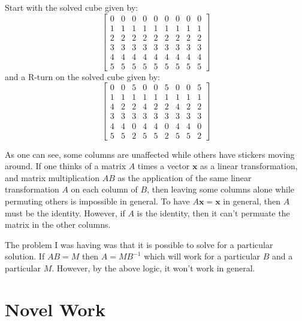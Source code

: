 \documentclass[11pt, oneside]{article}
\newcommand{\ve}[1]{\mathbf{#1}}
\theoremstyle{plain}
\begin{document}
Start with the solved cube given by:
\[ \begin{bmatrix}
0 & 0 & 0 & 0 & 0 & 0 & 0 & 0 & 0 \\
1 & 1 & 1 & 1 & 1 & 1 & 1 & 1 & 1 \\
2 & 2 & 2 & 2 & 2 & 2 & 2 & 2 & 2 \\
3 & 3 & 3 & 3 & 3 & 3 & 3 & 3 & 3 \\
4 & 4 & 4 & 4 & 4 & 4 & 4 & 4 & 4 \\
5 & 5 & 5 & 5 & 5 & 5 & 5 & 5 & 5
\end{bmatrix} \]
and a R-turn on the solved cube given by:
\[ \begin{bmatrix}
0 & 0 & 5 & 0 & 0 & 5 & 0 & 0 & 5 \\
1 & 1 & 1 & 1 & 1 & 1 & 1 & 1 & 1 \\
4 & 2 & 2 & 4 & 2 & 2 & 4 & 2 & 2 \\
3 & 3 & 3 & 3 & 3 & 3 & 3 & 3 & 3 \\
4 & 4 & 0 & 4 & 4 & 0 & 4 & 4 & 0 \\
5 & 5 & 2 & 5 & 5 & 2 & 5 & 5 & 2
\end{bmatrix} \]

As one can see, some columns are unaffected while others have stickers moving around.
If one thinks of a matrix \( A \) times a vector \( \ve{x} \) as a linear transformation,
and matrix multiplication \( AB \) as the application of the same linear transformation \( A \)
on each column of \( B \), then leaving some columns alone while permuting others is impossible in general.
To have \( A\ve{x} = \ve{x} \) in general, then \( A \) must be the identity.
However, if \( A \) is the identity, then it can't permuate the matrix in the other columns.

The problem I was having was that it is possible to solve for a particular solution.
If \( AB = M \) then \( A = MB^{-1} \) which will work for a particular \( B \) and a particular \( M \).
However, by the above logic, it won't work in general.

\section{Novel Work}
\end{document}
